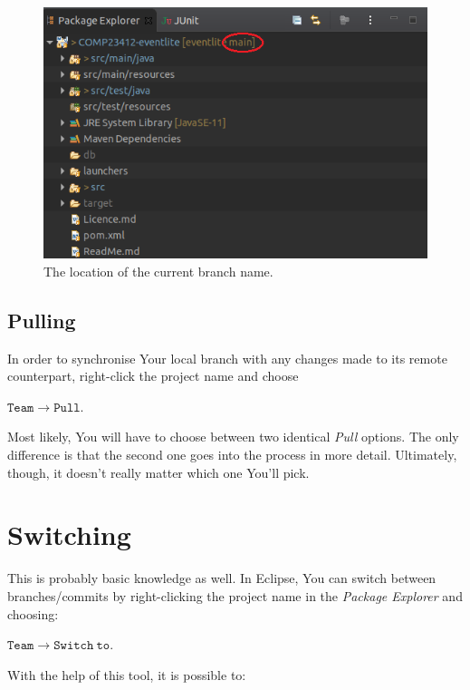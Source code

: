 \documentclass{article}
\begin{document}
\begin{figure}[h]
    \centering
    \includegraphics[scale=0.6]{branch_name.png}
    \caption{The location of the current branch name.}
    \label{fig:branch_name}
\end{figure}

\subsection{Pulling}
\label{sec:pulling}

In order to synchronise Your local branch with any changes made to its remote counterpart, right-click the project name and choose

$\mathtt{Team \rightarrow Pull}$. \newline

Most likely, You will have to choose between two identical \textit{Pull} options. The only difference is that the second one goes into the process in more detail. Ultimately, though, it doesn't really matter which one You'll pick.

\section{Switching}
\label{sec:switching}

This is probably basic knowledge as well. In Eclipse, You can switch between branches/commits by right-clicking the project name in the \textit{Package Explorer} and choosing:\newline

$\mathtt{Team \rightarrow Switch\ to}$.\newline

With the help of this tool, it is possible to:
\end{document}
